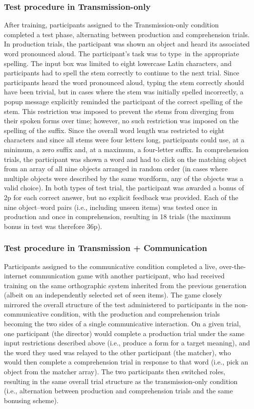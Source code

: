\documentclass[doc,biblatex]{apa7}
\begin{document}
\subsubsection{Test procedure in Transmission-only}

After training, participants assigned to the Transmission-only condition completed a test phase, alternating between production and comprehension trials. In production trials, the participant was shown an object and heard its associated word pronounced aloud. The participant's task was to type~in the appropriate spelling. The input box was limited to eight lowercase Latin characters, and participants had to spell the stem correctly to continue to the next trial. Since participants heard the word pronounced aloud, typing the stem correctly should have been trivial, but in cases where the stem was initially spelled incorrectly, a popup message explicitly reminded the participant of the correct spelling of the stem. This restriction was imposed to prevent the stems from diverging from their spoken forms over time; however, no such restriction was imposed on the spelling of the suffix. Since the overall word length was restricted to eight characters and since all stems were four letters long, participants could use, at a minimum, a zero suffix and, at a maximum, a four-letter suffix. In comprehension trials, the participant was shown a word and had to click on the matching object from an array of all nine objects arranged in random order (in cases where multiple objects were described by the same wordform, any of the objects was a valid choice). In both types of test trial, the participant was awarded a bonus of 2p for each correct answer, but no explicit feedback was provided. Each of the nine object--word pairs (i.e., including unseen items) was tested once in production and once in comprehension, resulting in 18 trials (the maximum bonus in test was therefore 36p).

\subsubsection{Test procedure in Transmission + Communication}

Participants assigned to the communicative condition completed a live, over-the-internet communication game with another participant, who had received training on the same orthographic system inherited from the previous generation (albeit on an independently selected set of seen items). The game closely mirrored the overall structure of the test administered to participants in the non-communicative condition, with the production and comprehension trials becoming the two sides of a single communicative interaction. On a given trial, one participant (the director) would complete a production trial under the same input restrictions described above (i.e., produce a form for a target meaning), and the word they used was relayed to the other participant (the matcher), who would then complete a comprehension trial in response to that word (i.e., pick an object from the matcher array). The two participants then switched roles, resulting in the same overall trial structure as the transmission-only condition (i.e., alternation between production and comprehension trials and the same bonusing scheme).
\end{document}
